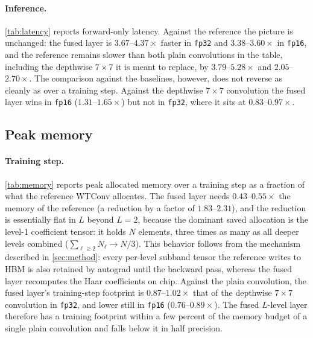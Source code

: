 \documentclass[10pt]{article} %
\theoremstyle{plain}
\begin{document}
\paragraph{Inference.}
\label{sec:results-latency-inference}
\autoref{tab:latency} reports forward-only latency. Against the reference the
picture is unchanged: the fused layer is $3.67$--$4.37\times$ faster in
\texttt{fp32} and $3.38$--$3.60\times$ in \texttt{fp16}, and the reference remains
slower than both plain convolutions in the table, including the depthwise
$7\times7$ it is meant to replace, by $3.79$--$5.28\times$ and
$2.05$--$2.70\times$. The comparison against the baselines, however, does not
reverse as cleanly as over a training step. Against the depthwise $7\times7$
convolution the fused layer wins in \texttt{fp16} ($1.31$--$1.65\times$) but not
in \texttt{fp32}, where it sits at $0.83$--$0.97\times$.

\subsection{Peak memory}
\label{sec:results-memory}



\paragraph{Training step.} \autoref{tab:memory} reports peak allocated memory over
a training step as a fraction of what the reference WTConv allocates. The fused
layer needs $0.43$--$0.55\times$ the memory of the reference (a reduction by a
factor of $1.83$--$2.31$), and the reduction is essentially flat in $L$ beyond
$L{=}2$, because the dominant saved allocation is the level-1 coefficient tensor:
it holds $N$ elements, three times as many as all deeper levels combined
($\sum_{\ell\ge2}N_\ell\to N/3$). This behavior follows from the mechanism described in \autoref{sec:method}: every per-level subband tensor the reference writes to HBM is also
retained by autograd until the backward pass, whereas the fused layer recomputes
the Haar coefficients on chip. Against the plain convolution, the fused layer's
training-step footprint is $0.87$--$1.02\times$ that of the depthwise $7\times7$
convolution in \texttt{fp32}, and lower still in \texttt{fp16}
($0.76$--$0.89\times$). The fused $L$-level layer therefore has a training footprint
within a few percent of the memory budget of a single plain convolution and falls
below it in half precision.
\end{document}
